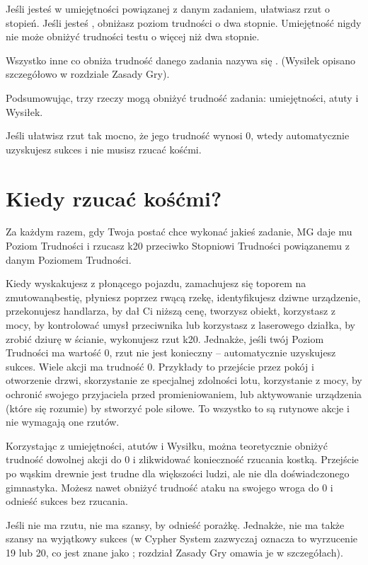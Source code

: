 Jeśli jesteś  w umiejętności powiązanej z danym zadaniem, ułatwiasz rzut o stopień. Jeśli jesteś , obniżasz poziom trudności o dwa stopnie. Umiejętność nigdy nie może obniżyć trudności testu o więcej niż dwa stopnie. 

Wszystko inne co obniża trudność danego zadania nazywa się . (Wysiłek opisano szczegółowo w rozdziale Zasady Gry).

Podsumowując, trzy rzeczy mogą obniżyć trudność zadania: umiejętności, atuty i Wysiłek. 

Jeśli ułatwisz rzut tak mocno, że jego trudność wynosi 0, wtedy automatycznie uzyskujesz sukces i nie musisz rzucać kośćmi. 

\section {Kiedy rzucać kośćmi?}

Za każdym razem, gdy Twoja postać chce wykonać jakieś zadanie, MG daje mu Poziom Trudności i rzucasz k20 przeciwko Stopniowi Trudności powiązanemu z danym Poziomem Trudności.

Kiedy wyskakujesz z płonącego pojazdu, zamachujesz się toporem na zmutowanąbestię, płyniesz poprzez rwącą rzekę, identyfikujesz dziwne urządzenie, przekonujesz handlarza, by dał Ci niższą cenę, tworzysz obiekt, korzystasz z mocy, by kontrolować umysł przeciwnika lub korzystasz z laserowego działka, by zrobić dziurę w ścianie, wykonujesz rzut k20.
Jednakże, jeśli twój Poziom Trudności ma wartość 0, rzut nie jest konieczny – automatycznie uzyskujesz sukces. Wiele akcji ma trudność 0. Przykłady to przejście przez pokój i otworzenie drzwi, skorzystanie ze specjalnej zdolności lotu, korzystanie z mocy, by ochronić swojego przyjaciela przed promieniowaniem, lub aktywowanie urządzenia (które się rozumie) by stworzyć pole siłowe. To wszystko to są rutynowe akcje i nie wymagają one rzutów.

Korzystając z umiejętności, atutów i Wysiłku, można teoretycznie obniżyć trudność dowolnej akcji do 0 i zlikwidować konieczność rzucania kostką. Przejście po wąskim drewnie jest trudne dla większości ludzi, ale nie dla doświadczonego gimnastyka. Możesz nawet obniżyć trudność ataku na swojego wroga do 0 i odnieść sukces bez rzucania.

Jeśli nie ma rzutu, nie ma szansy, by odnieść porażkę. Jednakże, nie ma także szansy na wyjątkowy sukces (w Cypher System zazwyczaj oznacza to wyrzucenie 19 lub 20, co jest znane jako ; rozdział Zasady Gry omawia je w szczegółach).

